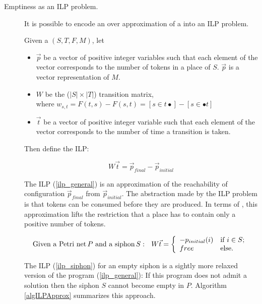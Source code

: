 \documentclass[a4paper]{report}
\numberwithin{algorithm}{chapter}
\begin{document}
\begin{description}
\item[Emptiness as an ILP problem.]
It is possible to encode an over approximation of a \pn{} into an ILP problem.

Given a \pn{} $(S,T,F,M)$, let
\begin{itemize}
\item $\vec p$ be a vector of positive integer variables such that each element of the vector corresponds to the number of tokens in a place of $S$.
$\vec p$ is a vector representation of $M$.
\item $W$ be the ($|S| \times |T|$) transition matrix,\\
where $w_{s,t} = F(t,s) - F(s,t) = [s \in t \bullet] - [s \in \bullet t]$
\item $\vec t$ be a vector of positive integer variable such that each element of the vector corresponds to the number of time a transition is taken.
\end{itemize}
Then define the ILP:

\begin{equation}
\label{ilp_general}
W \vec t = \vec p_{final} - \vec p_{initial}
\end{equation}

The ILP (\ref{ilp_general}) is an approximation of the reachability of configuration $\vec p_{final}$ from $\vec p_{initial}$.
The abstraction made by the ILP problem is that tokens can be consumed before they are produced.
In terms of \pns{}, this approximation lifts the restriction that a place has to contain only a positive number of tokens.

\begin{equation}
\label{ilp_siphon}
\text{Given a \pn{}} \, P ~ \text{and a siphon} \, S: ~~
  W \vec t = \left\{ \begin{array}{ll}
         -p_{initial}(i) & \mbox{if $i \in S$};\\
         free & \mbox{else}.\end{array} \right.
\end{equation}

The ILP (\ref{ilp_siphon}) for an empty siphon is a sightly more relaxed version of the program (\ref{ilp_general}):
If this program does not admit a solution then the siphon $S$ cannot become empty in $P$.
Algorithm \ref{algILPApprox} summarizes this approach.


\end{description}
\end{document}
